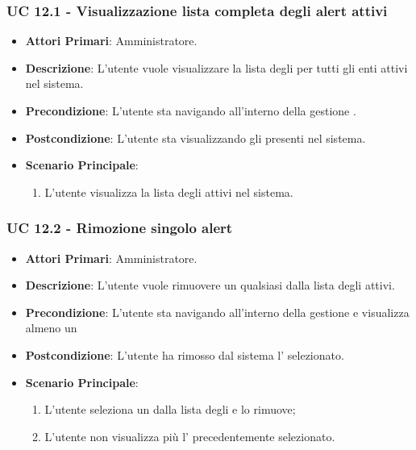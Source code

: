 		\subsubsection{UC 12.1 - Visualizzazione lista completa degli alert attivi}
		\begin{itemize}
			\item \textbf{Attori Primari}: Amministratore.
			\item \textbf{Descrizione}: L'utente vuole visualizzare la lista degli  per tutti gli enti attivi nel sistema.
			\item \textbf{Precondizione}: L'utente sta navigando all'interno della gestione .
			\item \textbf{Postcondizione}: L'utente sta visualizzando gli  presenti nel sistema.
			\item \textbf{Scenario Principale}:
			\begin{enumerate}
				\item{L'utente visualizza la lista degli  attivi nel sistema.}
			\end{enumerate}	
		\end{itemize}

		\subsubsection{UC 12.2 - Rimozione singolo alert}
		\begin{itemize}
			\item \textbf{Attori Primari}: Amministratore.
			\item \textbf{Descrizione}: L'utente vuole rimuovere un qualsiasi  dalla lista degli  attivi.
			\item \textbf{Precondizione}: L'utente sta navigando all'interno della gestione  e visualizza almeno un 
			\item \textbf{Postcondizione}: L'utente ha rimosso dal sistema l' selezionato.
			\item \textbf{Scenario Principale}:
			\begin{enumerate}
				\item{L'utente seleziona un  dalla lista degli  e lo rimuove;}
				\item{L'utente non visualizza più l' precedentemente selezionato.}
			\end{enumerate}	
		\end{itemize}